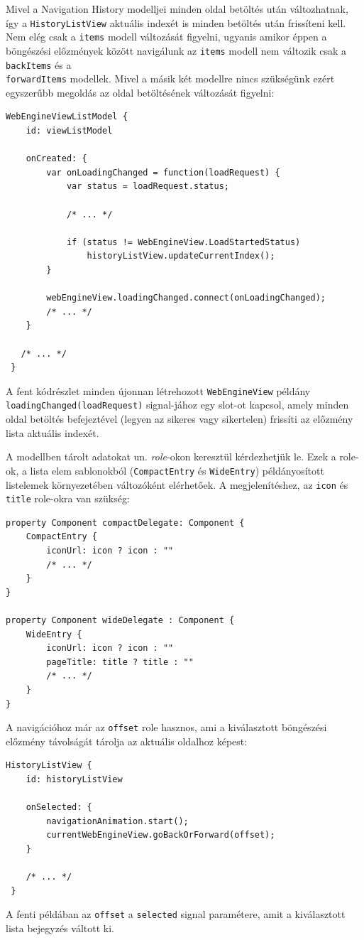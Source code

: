 \documentclass[12pt]{report}
\begin{document}
Mivel a Navigation History modelljei minden oldal betöltés után változhatnak, így a
\texttt{HistoryListView} aktuális indexét is minden betöltés után frissíteni kell. Nem elég
csak a \texttt{items} modell változását figyelni, ugyanis amikor éppen a böngészési előzmények
között navigálunk az \texttt{items} modell nem változik csak a \texttt{backItems} és a \\
\texttt{forwardItems} modellek. Mivel a másik két modellre nincs szükségünk ezért egyszerűbb
megoldás az oldal betöltésének változását figyelni:
\newpage
\begin{lstlisting}[title=main.qml]
 WebEngineViewListModel {
    id: viewListModel

    onCreated: {
        var onLoadingChanged = function(loadRequest) {
            var status = loadRequest.status;

            /* ... */

            if (status != WebEngineView.LoadStartedStatus)
                historyListView.updateCurrentIndex();
        }

        webEngineView.loadingChanged.connect(onLoadingChanged);
        /* ... */
    }

   /* ... */
 }
\end{lstlisting}
A fent kódrészlet minden újonnan létrehozott \texttt{WebEngineView} példány \\
\texttt{loadingChanged(loadRequest)} signal-jához egy slot-ot kapcsol, amely minden oldal
betöltés befejeztével (legyen az sikeres vagy sikertelen) frissíti az előzmény lista
aktuális indexét.

A modellben tárolt adatokat un. \textit{role}-okon keresztül kérdezhetjük le. Ezek a role-ok,
a lista elem sablonokból (\texttt{CompactEntry} és \texttt{WideEntry}) példányosított
listelemek környezetében változóként elérhetőek. A megjelenítéshez, az \texttt{icon} és
\texttt{title} role-okra van szükség:
\begin{lstlisting}[title=views/HistoryListView.qml]
property Component compactDelegate: Component {
    CompactEntry {
        iconUrl: icon ? icon : ""
        /* ... */
    }
}

property Component wideDelegate : Component {
    WideEntry {
        iconUrl: icon ? icon : ""
        pageTitle: title ? title : ""
        /* ... */
    }
}
\end{lstlisting}
A navigációhoz már az \texttt{offset} role hasznos, ami a kiválasztott böngészési előzmény
távolságát tárolja az aktuális oldalhoz képest:
\begin{lstlisting}[title=main.qml]
 HistoryListView {
    id: historyListView

    onSelected: {
        navigationAnimation.start();
        currentWebEngineView.goBackOrForward(offset);
    }

    /* ... */
 }
\end{lstlisting}
A fenti példában az \texttt{offset} a \texttt{selected} signal paramétere, amit a kiválasztott
lista bejegyzés váltott ki.
\end{document}
